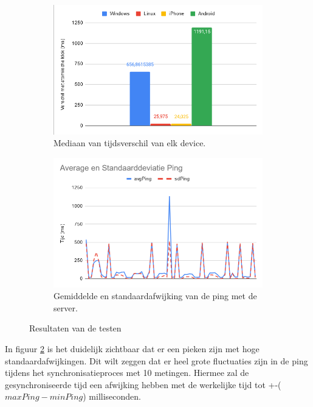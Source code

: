 \begin{figure}[H]
	\centering
	\begin{subfigure}{.5\textwidth}
		\centering
		\includegraphics[width=.95\linewidth]{img/mediaan.png}
		\caption{Mediaan van tijdsverschil van elk device.}
		\label{fig:mediaan}
	\end{subfigure}%
	\begin{subfigure}{.5\textwidth}
		\centering
		\includegraphics[width=.95\linewidth]{img/ping_results.png}
		\caption{Gemiddelde en standaardafwijking van de ping met de server. }
		\label{fig:avgPing}
	\end{subfigure}
	\caption{Resultaten van de testen}
	\label{fig:results}
\end{figure}

In figuur \ref{fig:avgPing} is het duidelijk zichtbaar dat er een pieken zijn met hoge standaardafwijkingen. Dit wilt zeggen dat er heel grote fluctuaties zijn in de ping tijdens het synchronisatieproces met 10 metingen. Hiermee zal de gesynchroniseerde tijd een afwijking hebben met de werkelijke tijd tot +-($maxPing - minPing$) milliseconden.




















